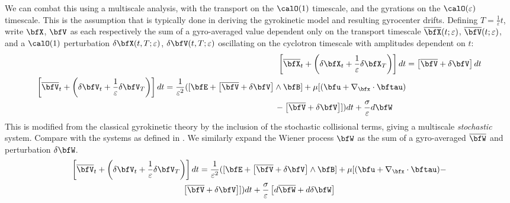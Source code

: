     We can combat this using a multiscale analysis, with the transport on the $\calO(1)$ timescale, and the gyrations on the $\calO(\varepsilon)$ timescale. This is the assumption that is typically done in deriving the gyrokinetic model and resulting gyrocenter drifts. Defining $T = \frac{1}{\varepsilon}t$, write $\bfX$, $\bfV$ as each respectively the sum of a gyro-averaged value dependent only on the transport timescale $\overline{\bfX}(t; \varepsilon)$, $\overline{\bfV}(t; \varepsilon)$, and a $\calO(1)$ perturbation $\delta\bfX(t, T; \varepsilon)$, $\delta\bfV(t, T; \varepsilon)$ oscillating on the cyclotron timescale with amplitudes dependent on $t$:
    \begin{align}
          \label{eqn:multiscale position SDE}  \left[\overline{\bfX}_{t} + \left(\delta\bfX_{t} + \frac{1}{\varepsilon}\delta\bfX_{T}\right)\right]dt  &= 
 \left[\overline{\bfV} + \delta\bfV\right]dt  \\
        \begin{split}
            \left[\overline{\bfV}_{t} + \left(\delta\bfV_{t} + \frac{1}{\varepsilon}\delta\bfV_{T}\right)\right]dt  &=  \frac{1}{\varepsilon^{2}}([\bfE + \left[\overline{\bfV} + \delta\bfV\right]\wedge\bfB] + \mu[(\bfu + \nabla_{\bfx}\cdot\bftau)  \\
            &  \;\;\;\;\;\;\;\;\;\;\;\;\;\;\;\;\;\;\;\;\;\;\;\;\;\;\;\;\;\;\;\;\;\;\;\;\;\;\;\;\;\;\;\;\;\;\;\;  - \left[\overline{\bfV} + \delta\bfV\right]])dt + \frac{\sigma}{\varepsilon}d\bfW
        \end{split}
    \end{align}
    \BA{[Ref]} This is modified from the classical gyrokinetic theory by the inclusion of the stochastic collisional terms, giving a multiscale \emph{stochastic} system. Compare with the systems as defined in . We similarly expand the Wiener process $\bfW$ as the sum of a gyro-averaged $\overline{\bfW}$ and perturbation $\delta\bfW$. 
    \begin{multline}\label{eqn:multiscale velocity SDE}
        \left[\overline{\bfV}_{t} + \left(\delta\bfV_{t} + \frac{1}{\varepsilon}\delta\bfV_{T}\right)\right]dt  =  \frac{1}{\varepsilon^{2}}([\bfE + \left[\overline{\bfV} + \delta\bfV\right]\wedge\bfB] + \mu[(\bfu + \nabla_{\bfx}\cdot\bftau) -  \\
        \left[\overline{\bfV} + \delta\bfV\right]])dt + \frac{\sigma}{\varepsilon}\left[d\overline{\bfW} + d\delta\bfW\right]
    \end{multline}
